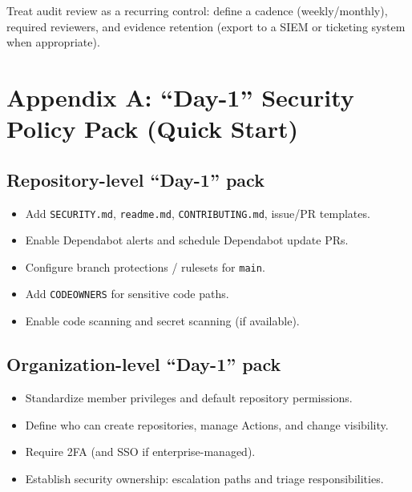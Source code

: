 \documentclass[11pt]{article}
\begin{document}
\begin{notebox}
Treat audit review as a recurring control: define a cadence (weekly/monthly), required reviewers, and evidence retention (export to a SIEM or ticketing system when appropriate).
\end{notebox}

\section{Appendix A: ``Day-1'' Security Policy Pack (Quick Start)}

\subsection{Repository-level ``Day-1'' pack}
\begin{checklistbox}[title={Repository Baseline}]
\begin{itemize}[leftmargin=*,itemsep=2pt]
  \item Add \texttt{SECURITY.md}, \texttt{readme.md}, \texttt{CONTRIBUTING.md}, issue/PR templates.
  \item Enable Dependabot alerts and schedule Dependabot update PRs.
  \item Configure branch protections / rulesets for \texttt{main}.
  \item Add \texttt{CODEOWNERS} for sensitive code paths.
  \item Enable code scanning and secret scanning (if available).
\end{itemize}
\end{checklistbox}

\subsection{Organization-level ``Day-1'' pack}
\begin{checklistbox}[title={Organization Baseline}]
\begin{itemize}[leftmargin=*,itemsep=2pt]
  \item Standardize member privileges and default repository permissions.
  \item Define who can create repositories, manage Actions, and change visibility.
  \item Require 2FA (and SSO if enterprise-managed).
  \item Establish security ownership: escalation paths and triage responsibilities.
\end{itemize}
\end{checklistbox}
\end{document}
